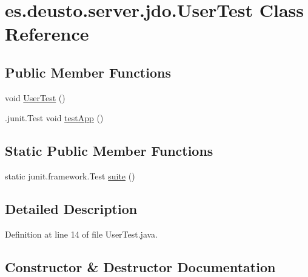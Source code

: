 \hypertarget{classes_1_1deusto_1_1server_1_1jdo_1_1_user_test}{}\section{es.\+deusto.\+server.\+jdo.\+User\+Test Class Reference}
\label{classes_1_1deusto_1_1server_1_1jdo_1_1_user_test}
\subsection*{Public Member Functions}
\begin{DoxyCompactItemize}
\item 
void \hyperlink{classes_1_1deusto_1_1server_1_1jdo_1_1_user_test_a00292ba5127aa4a2c2b31514c3a929ed}{User\+Test} ()
\item 
.junit.\+Test void \hyperlink{classes_1_1deusto_1_1server_1_1jdo_1_1_user_test_aec9f7ccc079890364b8270d8645e6957}{test\+App} ()
\end{DoxyCompactItemize}
\subsection*{Static Public Member Functions}
\begin{DoxyCompactItemize}
\item 
static junit.\+framework.\+Test \hyperlink{classes_1_1deusto_1_1server_1_1jdo_1_1_user_test_af4c617a2b9b0593aaaf7d21373190401}{suite} ()
\end{DoxyCompactItemize}


\subsection{Detailed Description}


Definition at line 14 of file User\+Test.\+java.



\subsection{Constructor \& Destructor Documentation}
\mbox{\label{classes_1_1deusto_1_1server_1_1jdo_1_1_user_test_a00292ba5127aa4a2c2b31514c3a929ed}} 
